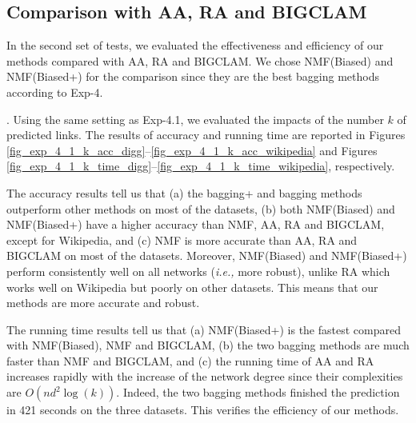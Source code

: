 \documentclass[10pt,journal,compsoc]{IEEEtran}
\newcommand{\stitle}[1]{\vspace{0.5ex}\noindent{\bf #1}}
\newcommand{\NMF}{{\sf NMF}\xspace }
\newcommand{\Biased}{{\sf NMF(Biased)}\xspace}
\newcommand{\Aa}{{\sf AA}\xspace }
\newcommand{\RA}{{\sf RA}\xspace }
\newcommand{\BIGCLAM}{{\sf BIGCLAM}\xspace}
\newcommand{\Digg}{{\sf Digg}\xspace}
\newcommand{\YouTube}{{\sf YouTube}\xspace}
\newcommand{\Wikipedia}{{\sf Wikipedia}\xspace}
\newcommand{\Biasedp}{{\sf NMF(Biased+)}\xspace}
\newcommand{\ie}{\emph{i.e.,}\xspace}
\newcommand{\resp}{\emph{resp.}\xspace}
\begin{document}
\subsection{Comparison with \Aa, \RA and \BIGCLAM}
In the second set of tests, we evaluated the effectiveness and efficiency of
our methods compared with \Aa, \RA and \BIGCLAM. We chose \Biased and \Biasedp
for the comparison since they are the best bagging methods according to Exp-4.



\stitle{Exp-5.1: Impacts of $k$}. Using the same setting as
Exp-4.1, we evaluated the impacts of the number $k$ of predicted links.
The results of accuracy and running time are reported
in Figures \ref{fig_exp_4_1_k_acc_digg}--\ref{fig_exp_4_1_k_acc_wikipedia} and
Figures \ref{fig_exp_4_1_k_time_digg}--\ref{fig_exp_4_1_k_time_wikipedia}, respectively.

The accuracy results tell us that (a) the bagging+ and bagging methods outperform other methods on
most of the datasets, (b) both \Biased and \Biasedp have a higher accuracy than
\NMF, \Aa, \RA and \BIGCLAM, except for \Wikipedia,
and (c) \NMF is more accurate than \Aa, \RA and \BIGCLAM on most of the datasets.
Moreover, \Biased and \Biasedp perform consistently well on all networks (\ie more robust),
unlike \RA which works well on \Wikipedia but poorly on other datasets.
This means that our methods are more accurate and robust.



The running time results tell us that (a) \Biasedp is the fastest compared with
\Biased, \NMF and \BIGCLAM, (b) the two bagging methods are much faster
than \NMF and \BIGCLAM, and (c) the running time of \Aa and \RA increases
rapidly with the increase of the network degree since their complexities
are $O(nd^2\log(k))$. Indeed, the two bagging methods finished the
prediction in 421 seconds on the three datasets.
This verifies the efficiency of our methods.
\end{document}
